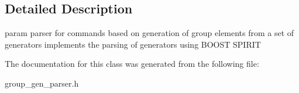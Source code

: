\subsection{Detailed Description}
param parser for commands based on generation of group elements from a set of generators implements the parsing of generators using B\-O\-O\-S\-T S\-P\-I\-R\-I\-T 

The documentation for this class was generated from the following file\-:\begin{DoxyCompactItemize}
\item 
group\-\_\-gen\-\_\-parser.\-h\end{DoxyCompactItemize}
